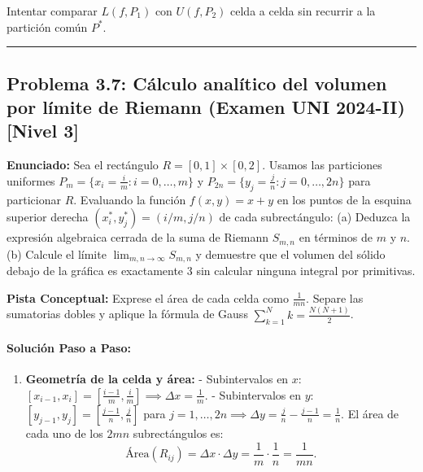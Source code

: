 \documentclass[11pt,a4paper]{article}
\begin{document}
\begin{trapbox}
Intentar comparar $L(f,P_1)$ con $U(f,P_2)$ celda a celda sin recurrir a la partición común $P^*$.
\end{trapbox}

\vspace{0.5cm}
\hrule
\vspace{0.5cm}

\subsection*{Problema 3.7: Cálculo analítico del volumen por límite de Riemann (Examen UNI 2024-II) \hfill \color{primaryblue}\small[Nivel 3]}

\begin{tcolorbox}[colback=white,colframe=gray!40,arc=1mm,boxrule=0.5pt,left=3mm,right=3mm,top=2mm,bottom=2mm]
\textbf{Enunciado:} Sea el rectángulo $R = [0, 1] \times [0, 2]$. Usamos las particiones uniformes $P_m = \{x_i = \frac{i}{m} : i=0,\dots,m\}$ y $P_{2n} = \{y_j = \frac{j}{n} : j=0,\dots,2n\}$ para particionar $R$. Evaluando la función $f(x,y) = x + y$ en los puntos de la esquina superior derecha $(x_i^*, y_j^*) = (i/m, j/n)$ de cada subrectángulo:
(a) Deduzca la expresión algebraica cerrada de la suma de Riemann $S_{m,n}$ en términos de $m$ y $n$.
(b) Calcule el límite $\lim_{m,n\to\infty} S_{m,n}$ y demuestre que el volumen del sólido debajo de la gráfica es exactamente $3$ sin calcular ninguna integral por primitivas.
\end{tcolorbox}

\begin{tcolorbox}[colback=yellow!4,colframe=accentamber!70,arc=1mm,boxrule=0.5pt,left=3mm,right=3mm,top=1.5mm,bottom=1.5mm]
\textbf{Pista Conceptual:} Exprese el área de cada celda como $\frac{1}{mn}$. Separe las sumatorias dobles y aplique la fórmula de Gauss $\sum_{k=1}^N k = \frac{N(N+1)}{2}$.
\end{tcolorbox}

\paragraph{Solución Paso a Paso:}\par
\begin{enumerate}[label=\textbf{\arabic*.}]
\item \textbf{Geometría de la celda y área:}
- Subintervalos en $x$: $[x_{i-1}, x_i] = [\frac{i-1}{m}, \frac{i}{m}] \implies \Delta x = \frac{1}{m}$.
- Subintervalos en $y$: $[y_{j-1}, y_j] = [\frac{j-1}{n}, \frac{j}{n}]$ para $j = 1, \dots, 2n \implies \Delta y = \frac{j}{n} - \frac{j-1}{n} = \frac{1}{n}$.
El área de cada uno de los $2mn$ subrectángulos es:
\begin{equation*}
\text{Área}(R_{ij}) = \Delta x \cdot \Delta y = \frac{1}{m} \cdot \frac{1}{n} = \frac{1}{mn}.
\end{equation*}
\end{enumerate}
\end{document}
